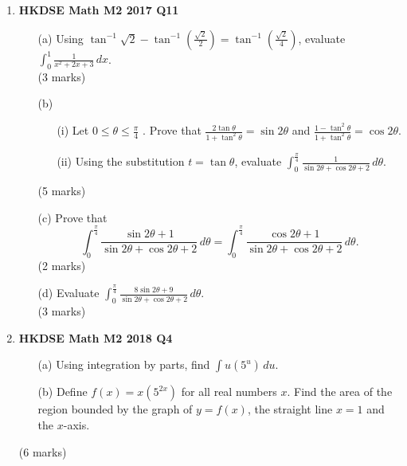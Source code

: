 \documentclass{report}
\begin{document}
\begin{enumerate}
	\item \textbf{HKDSE Math M2 2017 Q11}
	\begin{enumerate}
		\item [(a)]Using $\displaystyle\tan^{-1}{\sqrt{2}} - \tan^{-1}{\left(\frac{\sqrt{2}}{2}\right)} = \tan^{-1}{\left(\frac{\sqrt{2}}{4}\right)}$, evaluate $\displaystyle\int_{0}^{1} \frac{1}{x^2+2x+3}\,dx $. \\(3 marks)
		\item [(b)]
		\begin{enumerate}
			\item [(i)]Let $0 \leq \theta \leq \displaystyle\frac{\pi}{4}$ . Prove that $\displaystyle\frac{2\tan{\theta}}{1 + \tan^2{\theta}} = \sin{2\theta}$ and $\displaystyle\frac{1-\tan^2{\theta}}{1 + \tan^2{\theta}} = \cos{2\theta}$.
			\item [(ii)]Using the substitution $t = \tan{\theta}$, evaluate $\displaystyle\int_{0}^{\tfrac{\pi}{4}} \frac{1}{\sin{2\theta} + \cos{2\theta} + 2} \,d\theta$.
		\end{enumerate}
		(5 marks)
		\item [(c)]Prove that $$\displaystyle\int_{0}^{\tfrac{\pi}{4}} \frac{\sin{2\theta}+1 }{\sin{2\theta} + \cos{2\theta} + 2} \,d\theta = \displaystyle\int_{0}^{\tfrac{\pi}{4}} \frac{\cos{2\theta}+1}{\sin{2\theta} + \cos{2\theta} + 2} \,d\theta.$$(2 marks)
		\item [(d)]Evaluate $\displaystyle\int_{0}^{\tfrac{\pi}{4}} \frac{8\sin{2\theta} + 9}{\sin{2\theta} + \cos{2\theta} + 2} \,d\theta$. \\(3 marks)
	\end{enumerate}

	\item \textbf{HKDSE Math M2 2018 Q4}
	\begin{enumerate}
		\item [(a)]Using integration by parts, find $\displaystyle\int u(5^u) \,du$. 
		\item [(b)]Define $f(x) = x(5^{2x})$ for all real numbers $x$. Find the area of the region bounded by the graph of $y = f(x)$, the straight line $x = 1$ and the $x$-axis.
	\end{enumerate}
	(6 marks)
	

\end{enumerate}
\end{document}
